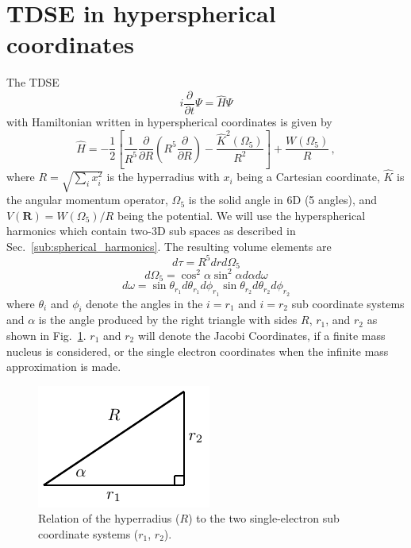 \section{TDSE in hyperspherical coordinates} %
\label{sec:tdse_in_hyperspherical_coordinates}
The TDSE
\begin{equation}
    i\frac{\partial}{\partial t}\Psi = \hat{H}\Psi
\end{equation}
with Hamiltonian written in hyperspherical coordinates is given by
\begin{equation}
   \hat{H} = -\frac{1}{2} \left[\frac{1}{R^5}\frac{\partial}{\partial R}\left(R^5\frac{\partial}{\partial R}\right) - \frac{\hat{K}^2(\Omega_5)}{R^2}\right] + \frac{W(\Omega_5)}{R}\, ,
\end{equation}
where $R=\sqrt{\sum_i x_i^2}$ is the hyperradius with $x_i$ being a Cartesian coordinate, $\hat{K}$ is the angular momentum operator, $\Omega_5$ is the solid angle in 6D (5 angles), and $V(\mathbf{R}) = W(\Omega_5)/R$ being the potential. We will use the hyperspherical harmonics which contain two-3D sub spaces as described in Sec.~\ref{sub:spherical_harmonics}. 
The resulting volume elements are 
\begin{equation}
    d\tau = R^5 dr d\Omega_5
\end{equation}
\begin{equation}
    d\Omega_5 = \cos^2\alpha \sin^2\alpha d\alpha d\omega
\end{equation}
\begin{equation}
    d\omega = \sin\theta_{r_1} d\theta_{r_1} d\phi_{r_1} \sin\theta_{r_2} d\theta_{r_2} d\phi_{r_2}
\end{equation}
where $\theta_i$ and $\phi_i$ denote the angles in the $i={r_1}$ and $i={r_2}$ sub coordinate systems and $\alpha$ is the angle produced by the right triangle with sides $R$, ${r_1}$, and ${r_2}$ as shown in Fig.~\ref{fig:hyperradius}. $r_1$ and $r_2$ will denote the Jacobi Coordinates, if a finite mass nucleus is considered, or the single electron coordinates when the infinite mass approximation is made.
\begin{figure}[h!]
\centering
\includegraphics[width=0.3\linewidth]{figs/Two_electron/hyperradius.pdf}
\caption{Relation of the hyperradius ($R$) to the two single-electron sub coordinate systems ($r_1$, $r_2$).} 
  \label{fig:hyperradius}
\end{figure}

